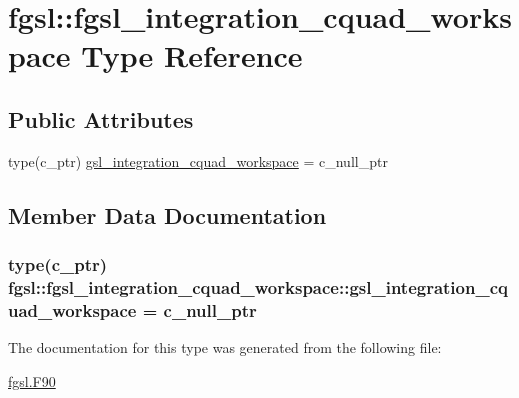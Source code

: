 \hypertarget{structfgsl_1_1fgsl__integration__cquad__workspace}{}\section{fgsl\+:\+:fgsl\+\_\+integration\+\_\+cquad\+\_\+workspace Type Reference}
\label{structfgsl_1_1fgsl__integration__cquad__workspace}
\subsection*{Public Attributes}
\begin{DoxyCompactItemize}
\item 
type(c\+\_\+ptr) \hyperlink{structfgsl_1_1fgsl__integration__cquad__workspace_ad8d5b9a3dff8f436c2b5dc4d7db6c8bd}{gsl\+\_\+integration\+\_\+cquad\+\_\+workspace} = c\+\_\+null\+\_\+ptr
\end{DoxyCompactItemize}


\subsection{Member Data Documentation}
\hypertarget{structfgsl_1_1fgsl__integration__cquad__workspace_ad8d5b9a3dff8f436c2b5dc4d7db6c8bd}{}
\subsubsection[{gsl\+\_\+integration\+\_\+cquad\+\_\+workspace}]{\setlength{\rightskip}{0pt plus 5cm}type(c\+\_\+ptr) fgsl\+::fgsl\+\_\+integration\+\_\+cquad\+\_\+workspace\+::gsl\+\_\+integration\+\_\+cquad\+\_\+workspace = c\+\_\+null\+\_\+ptr}\label{structfgsl_1_1fgsl__integration__cquad__workspace_ad8d5b9a3dff8f436c2b5dc4d7db6c8bd}


The documentation for this type was generated from the following file\+:\begin{DoxyCompactItemize}
\item 
\hyperlink{fgsl_8F90}{fgsl.\+F90}\end{DoxyCompactItemize}
